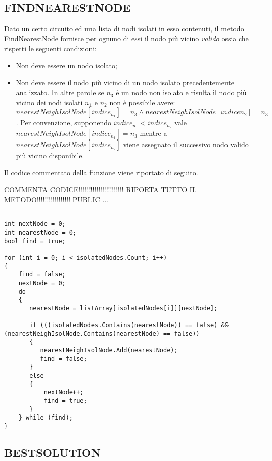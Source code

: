 \documentclass[11pt]{article}
\begin{document}
\subsection*{FINDNEARESTNODE}
\label{sec:FindNearestNodeS}

Dato un certo circuito ed una lista di nodi isolati in esso contenuti, il metodo FindNearestNode fornisce per ognuno di essi il nodo più vicino \textit{valido} ossia che rispetti le seguenti condizioni:

\begin{itemize}
    \item  Non deve essere un nodo isolato;
    \item  Non deve essere il nodo più vicino di un nodo isolato precedentemente analizzato. In altre parole se $n_3$ è un nodo non isolato e risulta il nodo più vicino dei nodi isolati $n_1$ e $n_2$ non è possibile avere: $nearestNeighIsolNode[indice_{n_1}] = n_3 \wedge nearestNeighIsolNode[indice{n_2}] = n_3$. Per convenzione, supponendo $indice_{n_1} < indice_{n_2}$ vale $nearestNeighIsolNode[indice_{n_1}] = n_3$ mentre a $nearestNeighIsolNode[indice_{n_2}]$ viene assegnato il successivo nodo valido più vicino disponibile.
\end{itemize}

Il codice commentato della funzione viene riportato di seguito.

COMMENTA CODICE!!!!!!!!!!!!!!!!!!!!!!! RIPORTA TUTTO IL METODO!!!!!!!!!!!!!!!!! PUBLIC ...

\begin{lstlisting}

int nextNode = 0;
int nearestNode = 0;
bool find = true;

for (int i = 0; i < isolatedNodes.Count; i++)
{
    find = false;
    nextNode = 0;
    do
    {
       nearestNode = listArray[isolatedNodes[i]][nextNode];

       if (((isolatedNodes.Contains(nearestNode)) == false) && (nearestNeighIsolNode.Contains(nearestNode) == false))
       {
          nearestNeighIsolNode.Add(nearestNode);
          find = false;
       }
       else
       {
           nextNode++;
           find = true;
       }
    } while (find);
}

\end{lstlisting}

\subsection*{BESTSOLUTION}
\label{sec:BestSolutionS}
\end{document}

